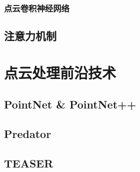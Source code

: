 \subsubsection{点云卷积神经网络}
\subsection{注意力机制}


\section{点云处理前沿技术}
\subsection{PointNet \& PointNet++}
\subsection{Predator}
\subsection{TEASER}